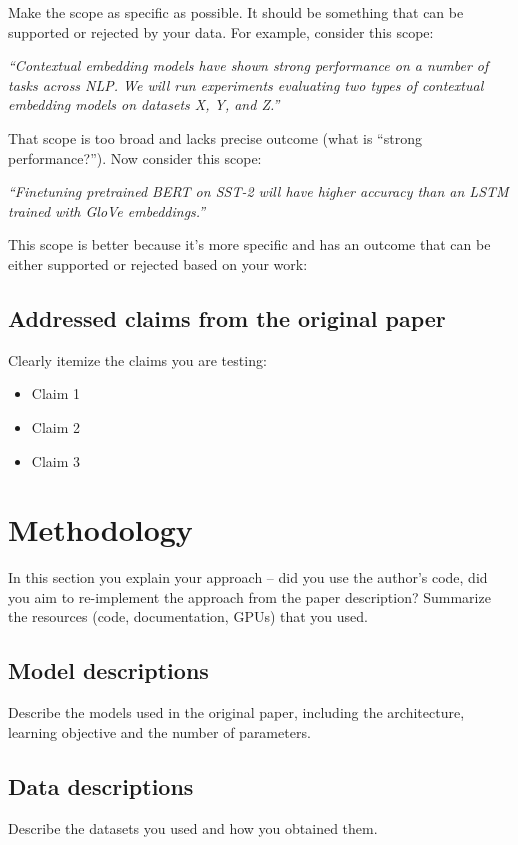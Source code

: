 \documentclass[11pt,a4paper]{article}
\begin{document}
Make the scope as specific as possible. It should be something that can be supported or rejected by your data. For example, consider this scope: 

\textit{``Contextual embedding models have shown strong performance on a number of tasks across NLP. We will run experiments evaluating two types of contextual embedding models on datasets X, Y, and Z.''}


That scope is too broad and lacks precise outcome (what is ``strong performance?''). Now consider this scope:

\textit{``Finetuning pretrained BERT on SST-2 will have higher accuracy than an LSTM trained with GloVe embeddings.''}

This scope is better because it's more specific and has an outcome that can be either supported or rejected based on your work: 
\subsection{Addressed claims from the original paper}

Clearly itemize the claims you are testing:
\begin{itemize}
    \item Claim 1
    \item Claim 2
    \item Claim 3
\end{itemize}


\section{Methodology}

In this section you explain your approach -- did you use the author's code, did you aim to re-implement the approach from the paper description? Summarize the resources (code, documentation, GPUs) that you used. 

\subsection{Model descriptions}
Describe the models used in the original paper, including the architecture, learning objective and the number of parameters.

\subsection{Data descriptions}
Describe the datasets you used and how you obtained them. 
\end{document}
